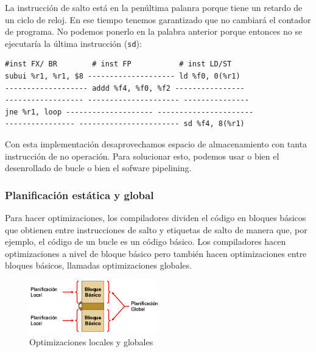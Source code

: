 \documentclass[10pt,a4paper,spanish]{report}
\begin{document}
La instrucción de salto está en la penúltima palanra porque tiene un retardo de un ciclo de reloj. En ese tiempo tenemos garantizado que no cambiará el contador de programa. No podemos ponerlo en la palabra anterior porque entonces no se ejecutaría la última instrucción (\verb*|sd|):

\begin{verbatim}
#inst FX/ BR        # inst FP           # inst LD/ST
subui %r1, %r1, $8 -------------------- ld %f0, 0(%r1)
------------------- addd %f4, %f0, %f2 ----------------
------------------ --------------------- ---------------
jne %r1, loop -------------------- ----------------------
---------------- ----------------------- sd %f4, 8(%r1)
\end{verbatim}

Con esta implementación desaprovechamos espacio de almacenamiento con tanta instrucción de no operación. Para solucionar esto, podemos usar o bien el desenrollado de bucle o bien el sofware pipelining.

\textcolor{azul}{\subsubsection{Planificación estática y global}}
Para hacer optimizaciones, los compiladores dividen el código en bloques básicos que obtienen entre instrucciones de salto y etiquetas de salto de manera que, por ejemplo, el código de un bucle es un código básico. Los compiladores hacen optimizaciones a nivel de bloque básico pero también hacen optimizaciones entre bloques básicos, llamadas optimizaciones globales.

\begin{figure}
\centering
\includegraphics[width=0.5\textwidth]{110}
\caption{Optimizaciones locales y globales}
\label{compilador_optimizaciones}
\end{figure}
\end{document}
